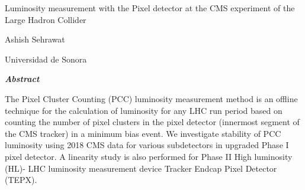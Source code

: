\documentclass[final,3p]{CSP}
\def\Student{Ashish Sehrawat}
\def\Universidad{Universidad de Sonora}
\def\ProjectTitle{Luminosity measurement with the Pixel detector at the CMS experiment of the Large Hadron Collider }
\begin{document}
\begin{adjustwidth}{1cm}{1cm}

  \begin{center}
    {\Large \ProjectTitle \par}
    \vspace{0.5cm}

    {\Student \par}
    {\Universidad \par}  
    \vspace{1cm}
    
    {\itshape\textbf{Abstract}\par}
     \vspace{0.7 cm}
        
    \end{center}  

 
    \onehalfspacing
    The Pixel Cluster Counting (PCC) luminosity measurement method is an offline technique for the calculation of  luminosity for any LHC run period based on counting the number of pixel clusters in the pixel detector (innermost segment of the CMS tracker) in a minimum bias event. We investigate stability of PCC luminosity using 2018 CMS data for various subdetectors in upgraded Phase I pixel detector. A linearity study is also performed for Phase II High luminosity (HL)- LHC luminosity measurement device Tracker Endcap Pixel Detector (TEPX).

\end{adjustwidth}

\hspace{2pt}
\vspace{1 cm}

\clearpage
\shipout\null


\newpage
\tableofcontents

\clearpage
\newpage





















\cleardoublepage
\onehalfspacing


\end{document}
